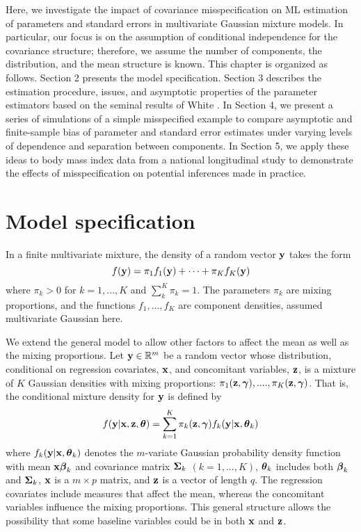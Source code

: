 Here, we investigate the impact of covariance misspecification on ML estimation of parameters and standard errors in multivariate Gaussian mixture models. In particular, our focus is on the assumption of conditional independence for the covariance structure; therefore, we assume the number of components, the distribution, and the mean structure is known. This chapter is organized as follows. Section 2 presents the model specification. Section 3 describes the estimation procedure, issues, and asymptotic properties of the parameter estimators based on the seminal results of White \cite{white1982}.  In Section 4, we present a series of simulations of a simple misspecified example to compare asymptotic and finite-sample bias of parameter and standard error estimates under varying levels of dependence and separation between components. In Section 5, we apply these ideas to body mass index data from a national longitudinal study to demonstrate the effects of misspecification on potential inferences made in practice. 

\section{Model specification}
In a finite multivariate mixture, the density of a random vector $\mathbf y$ takes the form
$$f(\mathbf y)=\pi_{1}f_{1}(\mathbf y)+\cdots+\pi_{K}f_{K}(\mathbf y)$$
where $\pi_{k}>0$ for $k=1,...,K$ and $\sum^{K}_{k}\pi_{k}=1$. The parameters $\pi_{k}$ are mixing proportions, and the functions $f_{1},...,f_{K}$ are component densities, assumed multivariate Gaussian here. 

We extend the general model to allow other factors to affect the mean as well as the mixing proportions. Let $\mathbf y\in\mathbb{R}^{m}$ be a random vector whose distribution, conditional on regression covariates, $\mathbf x$, and concomitant variables, $\mathbf z$, is a mixture of $K$ Gaussian densities with mixing proportions: $\pi_{1}(\mathbf z,\boldsymbol \gamma),....,\pi_{K}(\mathbf z,\boldsymbol \gamma)$. That is, the conditional mixture density for $\mathbf y$ is defined by
\begin{align}
f(\mathbf y|\mathbf x,\mathbf z,\boldsymbol \theta)=\sum^{K}_{k=1}\pi_{k}(\mathbf z,\boldsymbol\gamma)f_{k}(\mathbf y|\mathbf x,\boldsymbol\theta_{k}) \label{mixdens}
\end{align}
where $f_{k}(\mathbf y|\mathbf x,\boldsymbol\theta_{k})$ denotes the $m$-variate Gaussian probability density function with mean $\mathbf x\boldsymbol \beta_{k}$ and covariance matrix $\boldsymbol\Sigma_{k}$ $(k=1,...,K)$, $\boldsymbol\theta_{k}$ includes both $\boldsymbol\beta_{k}$ and $\boldsymbol\Sigma_{k}$, $\mathbf x$ is a $m\times p$ matrix, and $\mathbf z$ is a vector of length $q$. The regression covariates include measures that affect the mean, whereas the concomitant variables influence the mixing proportions. This general structure allows the possibility that some baseline variables could be in both $\mathbf x$ and $\mathbf z$. 

